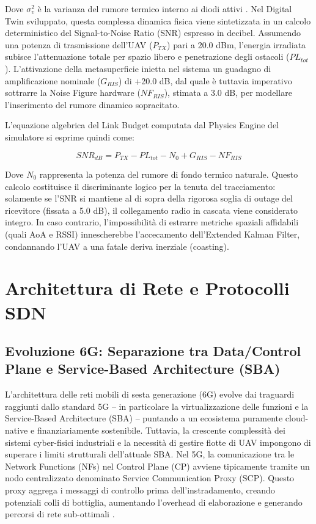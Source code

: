 \documentclass[twoside]{article}
\begin{document}
Dove $\sigma_v^2$ è la varianza del rumore termico interno ai diodi attivi \cite{Zhang2022}. Nel Digital Twin sviluppato, questa complessa dinamica fisica viene sintetizzata in un calcolo deterministico del Signal-to-Noise Ratio (SNR) espresso in decibel. Assumendo una potenza di trasmissione dell'UAV ($P_{TX}$) pari a 20.0 dBm, l'energia irradiata subisce l'attenuazione totale per spazio libero e penetrazione degli ostacoli ($PL_{tot}$). L'attivazione della metasuperficie inietta nel sistema un guadagno di amplificazione nominale ($G_{RIS}$) di +20.0 dB, dal quale è tuttavia imperativo sottrarre la Noise Figure hardware ($NF_{RIS}$), stimata a 3.0 dB, per modellare l'inserimento del rumore dinamico sopracitato.

L'equazione algebrica del Link Budget computata dal Physics Engine del simulatore si esprime quindi come:

\begin{equation}
SNR_{dB} = P_{TX} - PL_{tot} - N_0 + G_{RIS} - NF_{RIS}
\label{eq:snr_link_budget}
\end{equation}

Dove $N_0$ rappresenta la potenza del rumore di fondo termico naturale. Questo calcolo costituisce il discriminante logico per la tenuta del tracciamento: solamente se l'SNR si mantiene al di sopra della rigorosa soglia di outage del ricevitore (fissata a 5.0 dB), il collegamento radio in cascata viene considerato integro. In caso contrario, l'impossibilità di estrarre metriche spaziali affidabili (quali AoA e RSSI) innescherebbe l'accecamento dell'Extended Kalman Filter, condannando l'UAV a una fatale deriva inerziale (coasting).

\clearpage
\section{Architettura di Rete e Protocolli SDN}
\subsection{Evoluzione 6G: Separazione tra Data/Control Plane e Service-Based Architecture (SBA)}

L'architettura delle reti mobili di sesta generazione (6G) evolve dai traguardi raggiunti dallo standard 5G -- in particolare la virtualizzazione delle funzioni e la Service-Based Architecture (SBA) -- puntando a un ecosistema puramente cloud-native e finanziariamente sostenibile. Tuttavia, la crescente complessità dei sistemi cyber-fisici industriali e la necessità di gestire flotte di UAV impongono di superare i limiti strutturali dell'attuale SBA. Nel 5G, la comunicazione tra le Network Functions (NFs) nel Control Plane (CP) avviene tipicamente tramite un nodo centralizzato denominato Service Communication Proxy (SCP). Questo proxy aggrega i messaggi di controllo prima dell'instradamento, creando potenziali colli di bottiglia, aumentando l'overhead di elaborazione e generando percorsi di rete sub-ottimali \cite{Kolakowski2024}.
\end{document}
